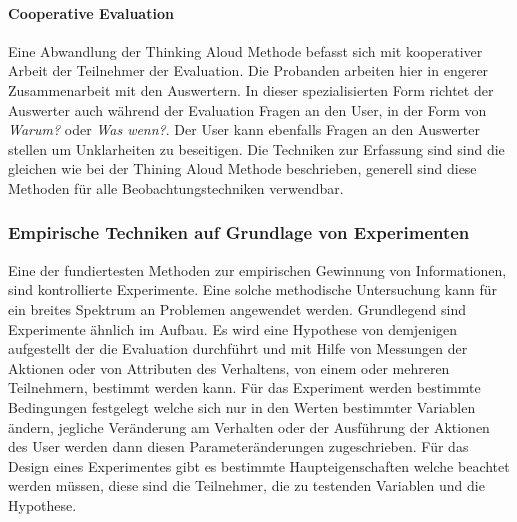 \documentclass[draft=false
              ,paper=a4
              ,twoside=false
              ,fontsize=11pt
              ,headsepline
              ,BCOR10mm
              ,DIV11
              ]{scrbook}
\begin{document}
\paragraph{Cooperative Evaluation} %
\label{par:cooperative_evaluation}
Eine Abwandlung der Thinking Aloud Methode befasst sich mit kooperativer Arbeit der Teilnehmer der Evaluation. Die Probanden arbeiten hier in engerer Zusammenarbeit mit den Auswertern. In dieser spezialisierten Form richtet der Auswerter auch während der Evaluation Fragen an den User, in der Form von \textit{Warum?} oder \textit{Was wenn?}. Der User kann ebenfalls Fragen an den Auswerter stellen um Unklarheiten zu beseitigen. Die Techniken zur Erfassung sind sind die gleichen wie bei der Thining Aloud Methode beschrieben, generell sind diese Methoden für alle Beobachtungstechniken verwendbar.
\subsubsection{Empirische Techniken auf Grundlage von Experimenten} %
\label{ssub:empirische_techniken_auf_grundlage_von_experimenten}
Eine der fundiertesten Methoden zur empirischen Gewinnung von Informationen, sind kontrollierte Experimente. Eine solche methodische Untersuchung kann für ein breites Spektrum an Problemen angewendet werden. Grundlegend sind Experimente ähnlich im Aufbau. Es wird eine Hypothese von demjenigen aufgestellt der die Evaluation durchführt und mit Hilfe von Messungen der Aktionen oder von Attributen des Verhaltens, von einem oder mehreren Teilnehmern, bestimmt werden kann. Für das Experiment werden bestimmte Bedingungen festgelegt welche sich nur in den Werten bestimmter Variablen ändern, jegliche Veränderung am Verhalten oder der Ausführung der Aktionen des User werden dann diesen Parameteränderungen zugeschrieben. Für das Design eines Experimentes gibt es bestimmte Haupteigenschaften welche beachtet werden müssen, diese sind die Teilnehmer, die zu testenden Variablen und die Hypothese.
\end{document}

